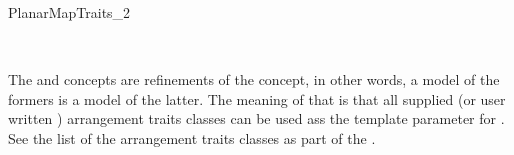 \begin{ccRefConcept}{PlanarMapTraits_2}
      

\ccHasModels
  \\

  The  and
   concepts are refinements of the
   concept, in other words, a model of the
  formers is a model of the latter.  The meaning of that is that all
  supplied (or user written ) arrangement traits classes can be used
  ass the  template parameter for
  .  See the list of the arrangement
  traits classes as part of the .
  
\end{ccRefConcept} %

\ccRefPageEnd















